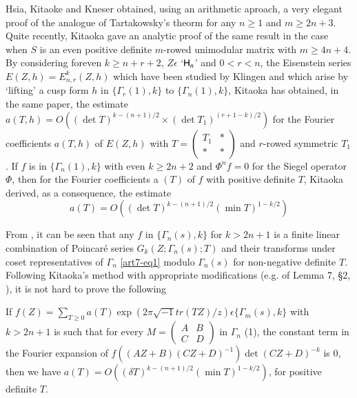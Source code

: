 Hsia, Kitaoke and Kneser \cite{art7-H-K-K} obtained, using an arithmetic aproach, a very elegant proof of the analogue of Tartakowsky's theorm for any $n \geqslant 1$ and $m \geqslant 2 n +3$. Quite recently, Kitaoka \cite{art7-KI} gave an analytic proof of the same result in the case when $S$ is an even positive definite $m$-rowed unimodular matrix with $m \geqslant 4n + 4$. By considering for\pageoriginale even $k \geqslant n + r + 2$, $Z \epsilon$ `$\mathsf{H}_n$' and $0< r < n$, the Eisenstein series $E(Z,h) = E^k_{n,r} (Z,h)$ which have been studied by Klingen \cite{art7-KL} and which arise by `lifting' a cusp form $h$ in $\{\Gamma_r (1), k\}$ to $\{\Gamma_n (1), k\}$, Kitaoka has obtained, in the same paper, the estimate $a(T, h) = O((\det T)^{k-(n+1)/2} \times (\det T_1)^{(r+1-k)/2})$ for the Fourier coefficients $a(T,h)$ of $E(Z,h)$ with $T = \begin{pmatrix} T_1 & \ast\\ \ast & \ast \end{pmatrix}$ and $r$-rowed symmetric $T_1$. If $f$ is in $\{\Gamma_n(1),k\}$ with even $k \geqslant 2n +2$ and $\Phi^n f = 0$ for the Siegel operator $\Phi$, then for the Fourier coefficients a $(T)$ of $f$ with positive definite $T$, Kitaoka derived, as a consequence, the estimate
\begin{equation}
a(T) = O((\det T)^{k - (n+1)/2} (\min T)^{1-k/2} ) \label{art7-eq4}
\end{equation}

From \cite{art7-C}, it can be seen that any $f$ in $\{\Gamma_n (s), k\}$ for $k > 2 n +1$ is a finite linear combination of Poincar\'e series $G_k (Z; \Gamma_n(s); T)$ and their transforms under coset representatives of $\Gamma_n$ \eqref{art7-eq1}  modulo $\Gamma_n(s)$ for non-negative definite $T$. Following Kitaoka's method with appropriate modifications (e.g. of Lemma 7, \S 2, \cite{art7-KI}), it is not hard to prove the following 

\begin{theorem*}
If $f(Z) = \sum\limits_{T \geqslant 0} a (T) \exp (2 \pi \sqrt{-1} tr (TZ)/ z) \epsilon \{\Gamma_m (s), k\}$ with $k > 2 n +1$ is such that for every $M = \begin{pmatrix}A & B \\ C & D \end{pmatrix}$ in $\Gamma_n$ (1), the constant term in the Fourier expansion of $f((AZ+B)(CZ+D)^{-1}) \det (CZ+ D)^{-k}$ is $0$, then we have $a(T) = O((\delta T)^{k-(n+1)/2} (\min T)^{1-k/2})$, for positive definite $T$.
\end{theorem*}

